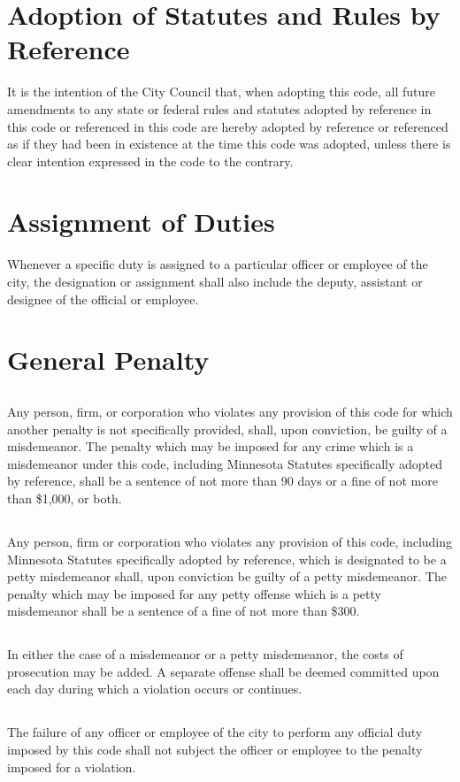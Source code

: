 \section{Adoption of Statutes and Rules by Reference}
It is the intention of the City Council that, when adopting this code, all future amendments to any state or federal rules and statutes adopted by reference in this code or referenced in this code are hereby adopted by reference or referenced as if they had been in existence at the time this code was adopted, unless there is clear intention expressed in the code to the contrary.



\section{Assignment of Duties}
Whenever a specific duty is assigned to a particular officer or employee of the city, the designation or assignment shall also include the deputy, assistant or designee of the official or employee.


\setcounter{section}{98}
\section{General Penalty}
\subsection{}
Any person, firm, or corporation who violates any provision of this code for which another penalty is not specifically provided, shall, upon conviction, be guilty of a misdemeanor.  The penalty which may be imposed for any crime which is a misdemeanor under this code, including Minnesota Statutes specifically adopted by reference, shall be a sentence of not more than 90 days or a fine of not more than \$1,000, or both.
\subsection{}
Any person, firm or corporation who violates any provision of this code, including Minnesota Statutes specifically adopted by reference, which is designated to be a petty misdemeanor shall, upon conviction be guilty of a petty misdemeanor.  The penalty which may be imposed for any petty offense which is a petty misdemeanor shall be a sentence of a fine of not more than \$300.
\subsection{}
In either the case of a misdemeanor or a petty misdemeanor, the costs of prosecution may be added.  A separate offense shall be deemed committed upon each day during which a violation occurs or continues.
\subsection{}
The failure of any officer or employee of the city to perform any official duty imposed by this code shall not subject the officer or employee to the penalty imposed for a violation.

%
